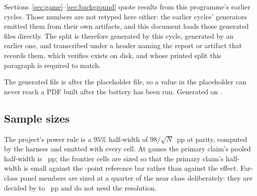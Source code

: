 Sections~\ref{sec:game}--\ref{sec:background} quote results from this programme's earlier cycles. Those
numbers are not retyped here either: the earlier cycles' generators emitted them from their own
artifacts, and this document loads those generated files directly. The split is therefore \vsevenProvGenerated{} generated by this cycle,
\vsevenProvInherited{} generated by an earlier one, and \vsevenProvTranscribed{} transcribed under a
header naming the report or artifact that records them, which
 verifies exists on disk, and whose printed split this
paragraph is required to match.

The generated file is \verb|| after the placeholder file, so a value in the placeholder can never
reach a PDF built after the battery has been run. Generated on \vsevenBuildDate{}.

\subsection*{Sample sizes}

The project's power rule is a $95\%$ half-width of $98/\sqrt{N}$~pp at parity, computed by the
harness and emitted with every cell. At \vsevenBtwoFcheapN{} games the primary claim's pooled half-width is
\vsevenBtwoFcheapHalfWidth{}~pp; the
frontier cells are sized so that the primary claim's half-width is small against the
\vsevenPrimaryFloor{}-point reference bar rather than against the effect. Far-class panel members are
sized at a quarter of the near class deliberately: they are decided by \vsevenFarSpanLo{} to \vsevenFarSpanHi{}~pp
and do not need the resolution.
